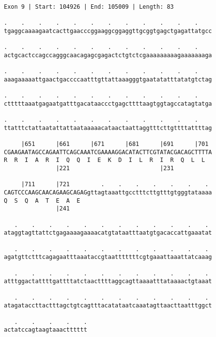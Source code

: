 \documentclass{article}
\begin{document}
\begin{Verbatim}
Exon 9 | Start: 104926 | End: 105009 | Length: 83
 
.    .    .    .    .    .    .    .    .    .    .    .    
tgaggcaaaagaatcacttgaacccggaaggcggaggttgcggtgagctgagattatgcc
  
.    .    .    .    .    .    .    .    .    .    .    .    
actgcactccagccagggcaacagagcgagactctgtctcgaaaaaaaaagaaaaaaaga
  
.    .    .    .    .    .    .    .    .    .    .    .    
aaagaaaaattgaactgaccccaatttgttattaaagggtgaatatatttatatgtctag
  
.    .    .    .    .    .    .    .    .    .    .    .    
ctttttaaatgagaatgatttgacataaccctgagcttttaagtggtagccatagtatga
  
.    .    .    .    .    .    .    .    .    .    .    .    
ttatttctattaatattattaataaaaacataactaattaggtttcttgttttattttag
  
     |651      |661      |671      |681      |691      |701 
CGAAGAATAGCCAGAATTCAGCAAATCGAAAAGGACATACTTCGTATACGACAGCTTTTA
R  R  I  A  R  I  Q  Q  I  E  K  D  I  L  R  I  R  Q  L  L  
               |221                          |231           
  
     |711      |721         .    .    .    .    .    .    . 
CAGTCCCAAGCAACAGAAGCAGAGgttagtaaattgcctttcttgtttgtgggtataaaa
Q  S  Q  A  T  E  A  E                                      
               |241                                         
  
   .    .    .    .    .    .    .    .    .    .    .    . 
ataggtagttattctgagaaaagaaaacatgtataatttaatgtgacaccattgaaatat
  
   .    .    .    .    .    .    .    .    .    .    .    . 
agatgttctttcagagaatttaaataccgtaatttttttcgtgaaattaaattatcaaag
  
   .    .    .    .    .    .    .    .    .    .    .    . 
atttggactattttgattttatctaacttttaggcagttaaaatttataaaactgtaaat
  
   .    .    .    .    .    .    .    .    .    .    .    . 
atagataccttactttagctgtcagtttacatataatcaaatagttaacttaatttggct
  
   .    .    .    .    .
actatccagtaagtaaactttttt
\end{Verbatim}
\newpage
\end{document}
